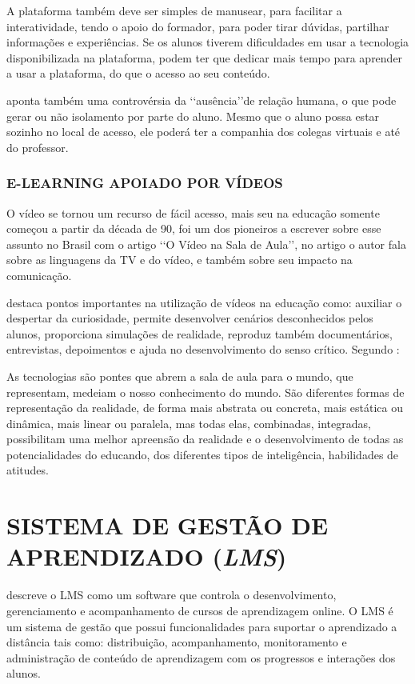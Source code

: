 A plataforma também deve ser simples de manusear, para facilitar a interatividade, tendo o apoio do formador, para poder tirar dúvidas, partilhar informações e experiências. Se os alunos tiverem dificuldades em usar a tecnologia disponibilizada na plataforma, podem ter que dedicar mais tempo para aprender a usar a plataforma, do que o acesso ao seu conteúdo. 

 aponta também uma controvérsia da \lq\lq ausência\rq\rq de relação humana, o que pode gerar ou não isolamento por parte do aluno. Mesmo que o aluno possa estar sozinho no local de acesso, ele poderá ter a companhia dos colegas virtuais e até do professor.

\subsubsection{E-LEARNING APOIADO POR VÍDEOS}
O vídeo se tornou um recurso de fácil acesso, mais seu na educação somente começou a partir da década de 90,  foi um dos pioneiros a escrever sobre esse assunto no Brasil com o artigo \lq\lq O Vídeo na Sala de Aula\rq\rq, no artigo o autor fala sobre as linguagens da TV e do vídeo, e também sobre seu impacto na comunicação.

 destaca pontos importantes na utilização de vídeos na educação como: auxiliar o despertar da curiosidade, permite desenvolver cenários desconhecidos pelos alunos, proporciona simulações de realidade, reproduz também documentários, entrevistas, depoimentos e ajuda no desenvolvimento do senso crítico. Segundo :
\begin{citacao}
  As tecnologias são pontes que abrem a sala de aula para o mundo, que representam, medeiam o nosso conhecimento do mundo. São diferentes formas de representação da realidade, de forma mais abstrata ou concreta, mais estática ou dinâmica, mais linear ou paralela, mas todas elas, combinadas, integradas, possibilitam uma melhor apreensão da realidade e o desenvolvimento de todas as potencialidades do educando, dos diferentes tipos de inteligência, habilidades de atitudes.
\end{citacao}

\section{SISTEMA DE GESTÃO DE APRENDIZADO (\textit{LMS})}

 descreve o \ac{LMS} como um software que controla o desenvolvimento, gerenciamento e acompanhamento de cursos de aprendizagem online. O \ac{LMS} é um sistema de gestão que possui funcionalidades para suportar o aprendizado a distância tais como: distribuição, acompanhamento, monitoramento e administração de conteúdo de aprendizagem com os progressos e interações dos alunos.

